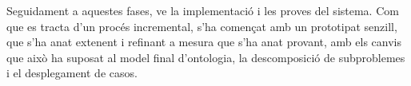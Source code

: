 Seguidament a aquestes fases, ve la implementació i les proves del sistema. Com que es tracta d'un procés incremental, s'ha començat amb un prototipat senzill, que s'ha anat extenent i refinant a mesura que s'ha anat provant, amb els canvis que això ha suposat al model final d'ontologia, la descomposició de subproblemes i el desplegament de casos.